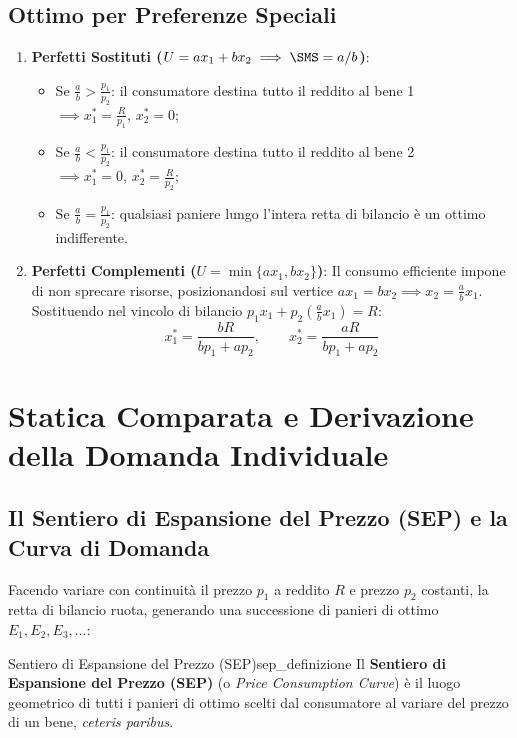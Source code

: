 \subsection{Ottimo per Preferenze Speciali}
\begin{enumerate}
    \item \textbf{Perfetti Sostituti ($U = ax_1 + bx_2 \implies \SMS = a/b$)}:
    \begin{itemize}
        \item Se $\frac{a}{b} > \frac{p_1}{p_2}$: il consumatore destina tutto il reddito al bene 1 $\implies x_1^* = \frac{R}{p_1}, \, x_2^* = 0$;
        \item Se $\frac{a}{b} < \frac{p_1}{p_2}$: il consumatore destina tutto il reddito al bene 2 $\implies x_1^* = 0, \, x_2^* = \frac{R}{p_2}$;
        \item Se $\frac{a}{b} = \frac{p_1}{p_2}$: qualsiasi paniere lungo l'intera retta di bilancio è un ottimo indifferente.
    \end{itemize}
    
    \item \textbf{Perfetti Complementi ($U = \min\{ax_1, bx_2\}$)}:
    Il consumo efficiente impone di non sprecare risorse, posizionandosi sul vertice $a x_1 = b x_2 \implies x_2 = \frac{a}{b} x_1$.
    Sostituendo nel vincolo di bilancio $p_1 x_1 + p_2 \left(\frac{a}{b} x_1\right) = R$:
    \begin{equation}
        x_1^* = \frac{b R}{b p_1 + a p_2}, \qquad x_2^* = \frac{a R}{b p_1 + a p_2}
    \end{equation}
\end{enumerate}

\section{Statica Comparata e Derivazione della Domanda Individuale}

\subsection{Il Sentiero di Espansione del Prezzo (SEP) e la Curva di Domanda}
Facendo variare con continuità il prezzo $p_1$ a reddito $R$ e prezzo $p_2$ costanti, la retta di bilancio ruota, generando una successione di panieri di ottimo $E_1, E_2, E_3, \dots$:

\begin{definizione}{Sentiero di Espansione del Prezzo (SEP)}{sep_definizione}
Il \textbf{Sentiero di Espansione del Prezzo (SEP)} (o \textit{Price Consumption Curve}) è il luogo geometrico di tutti i panieri di ottimo scelti dal consumatore al variare del prezzo di un bene, \textit{ceteris paribus}.
\end{definizione}

